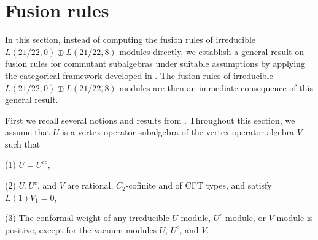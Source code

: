 \documentclass{article}
\begin{document}
\section{Fusion rules}
In this section, instead of computing the fusion rules of irreducible $L(21/22, 0)\oplus L(21/22, 8)$-modules directly, we establish a general result on fusion rules for commutant subalgebras under suitable assumptions by applying the categorical framework developed in \cite{DRX2}. The fusion rules of irreducible $L(21/22, 0)\oplus L(21/22, 8)$-modules are then an immediate consequence of this general result.

First we recall several notions and results from \cite{DRX2}.
Throughout this section, we assume that $U$ is a vertex operator subalgebra of the vertex operator algebra $V$ such that

(1) $U=U^{cc},$

(2) $U, U^c$, and $V$ are rational, $C_2$-cofinite and of CFT types, and satisfy $L(1)V_1=0$,

(3) The conformal weight of any irreducible $U$-module, $U^c$-module, or $V$-module is positive, except for the vacuum modules $U$, $U^c$, and $V.$
\end{document}
